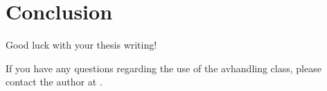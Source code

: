 \chapter{Conclusion}
\label{ch:conclusion}

Good luck with your thesis writing!

If you have any questions regarding the use of the \textsf{avhandling} class, please contact the author \authorname at \authormail.

